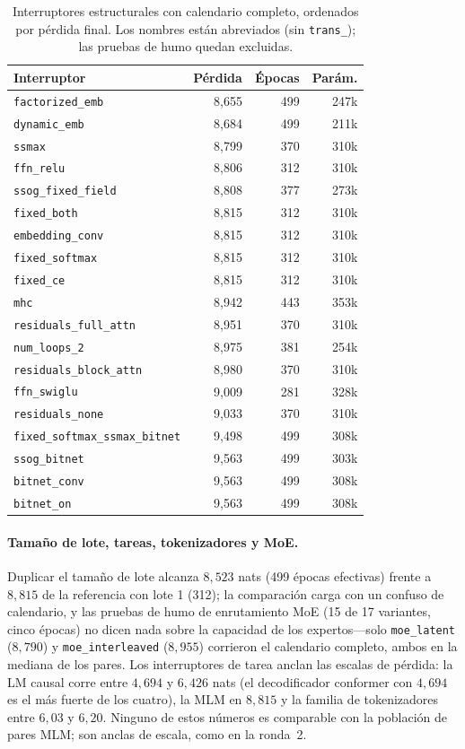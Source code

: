 \begin{table}[H]
\centering
\small
\caption{Interruptores estructurales con calendario completo, ordenados por pérdida final. Los nombres están abreviados (sin \texttt{trans\_}); las pruebas de humo quedan excluidas.}
\label{tab:r3-switches}
\begin{tabular}{lrrr}
\toprule
Interruptor & Pérdida & Épocas & Parám. \\
\midrule
\texttt{factorized\_emb} & 8,655 & 499 & 247k \\
\texttt{dynamic\_emb} & 8,684 & 499 & 211k \\
\texttt{ssmax} & 8,799 & 370 & 310k \\
\texttt{ffn\_relu} & 8,806 & 312 & 310k \\
\texttt{ssog\_fixed\_field} & 8,808 & 377 & 273k \\
\texttt{fixed\_both} & 8,815 & 312 & 310k \\
\texttt{embedding\_conv} & 8,815 & 312 & 310k \\
\texttt{fixed\_softmax} & 8,815 & 312 & 310k \\
\texttt{fixed\_ce} & 8,815 & 312 & 310k \\
\texttt{mhc} & 8,942 & 443 & 353k \\
\texttt{residuals\_full\_attn} & 8,951 & 370 & 310k \\
\texttt{num\_loops\_2} & 8,975 & 381 & 254k \\
\texttt{residuals\_block\_attn} & 8,980 & 370 & 310k \\
\texttt{ffn\_swiglu} & 9,009 & 281 & 328k \\
\texttt{residuals\_none} & 9,033 & 370 & 310k \\
\texttt{fixed\_softmax\_ssmax\_bitnet} & 9,498 & 499 & 308k \\
\texttt{ssog\_bitnet} & 9,563 & 499 & 303k \\
\texttt{bitnet\_conv} & 9,563 & 499 & 308k \\
\texttt{bitnet\_on} & 9,563 & 499 & 308k \\
\bottomrule
\end{tabular}
\end{table}

\paragraph{Tamaño de lote, tareas, tokenizadores y MoE.}
Duplicar el tamaño de lote alcanza $8,523$ nats (499 épocas efectivas) frente a $8,815$ de la referencia con lote 1 (312); la comparación carga con un confuso de calendario, y las pruebas de humo de enrutamiento MoE (15 de 17 variantes, cinco épocas) no dicen nada sobre la capacidad de los expertos---solo \texttt{moe\_latent} ($8,790$) y \texttt{moe\_interleaved} ($8,955$) corrieron el calendario completo, ambos en la mediana de los pares. Los interruptores de tarea anclan las escalas de pérdida: la LM causal corre entre $4,694$ y $6,426$ nats (el decodificador conformer con $4,694$ es el más fuerte de los cuatro), la MLM en $8,815$ y la familia de tokenizadores entre $6,03$ y $6,20$. Ninguno de estos números es comparable con la población de pares MLM; son anclas de escala, como en la ronda~2.


